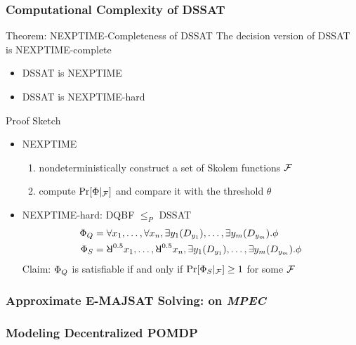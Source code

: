 \begin{frame}
    \frametitle{Computational Complexity of DSSAT}
    \begin{block}{Theorem: NEXPTIME-Completeness of DSSAT}
        The decision version of DSSAT is NEXPTIME-complete
        \begin{itemize}
            \item DSSAT is NEXPTIME
            \item DSSAT is NEXPTIME-hard
        \end{itemize}
    \end{block}
    \begin{block}{Proof Sketch}
        \begin{itemize}
            \item NEXPTIME
                  \begin{enumerate}
                      \item nondeterministically construct a set of Skolem functions $\mathcal{F}$
                      \item compute $\Pr[\Phi|_{\mathcal{F}}]$ and compare it with the threshold $\theta$
                  \end{enumerate}
            \item NEXPTIME-hard: DQBF $\leq_P$ DSSAT
                  \abovedisplayskip=0pt
                  \begin{align*}
                      \Qf_Q & = \forall x_1, \ldots, \forall x_n, \exists y_1(D_{y_1}), \ldots, \exists y_m(D_{y_m}).\pf           \\
                      \Qf_S & = \random{0.5} x_1, \ldots, \random{0.5} x_n, \exists y_1(D_{y_1}), \ldots, \exists y_m(D_{y_m}).\pf
                  \end{align*}
                  Claim: $\Phi_Q$ is satisfiable if and only if $\Pr[\Phi_S|_{\mathcal{F}}] \geq 1$ for some $\mathcal{F}$
        \end{itemize}
    \end{block}
\end{frame}

\begin{frame}
    \frametitle{Approximate E-MAJSAT Solving: \erssatb on \textit{MPEC}}
    \begin{table}[ht]
        \centering
        \scriptsize
    \end{table}
\end{frame}

\begin{frame}
    \frametitle{Modeling Decentralized POMDP}
    \begin{center}
        
    \end{center}
\end{frame}